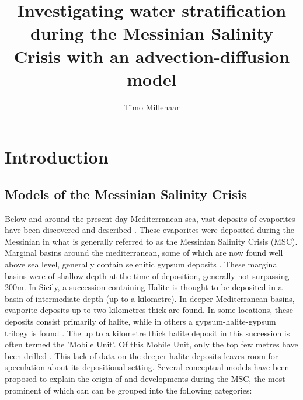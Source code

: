 \documentclass[twocolumn]{article}
\title{Investigating water stratification during the Messinian Salinity Crisis with an advection-diffusion model}
\author{Timo Millenaar}
\begin{document}

\section{Introduction}
\subsection{Models of the Messinian Salinity Crisis}
Below and around the present day Mediterranean sea, vast deposits of evaporites have been discovered and described \citep{hsu1972origin, krijgsman1999chronology, rouchy2006messinian, roveri2014messinian, garcia2018geochemical}. These evaporites were deposited during the Messinian in what is generally referred to as the Messinian Salinity Crisis (MSC). Marginal basins around the mediterranean, some of which are now found well above sea level, generally contain selenitic gypsum deposits \citep{garcia2018geochemical}. These marginal basins were of shallow depth at the time of deposition, generally not surpassing 200m. In Sicily, a succession containing Halite is thought to be deposited in a basin of intermediate depth (up to a kilometre). In deeper Mediterranean basins, evaporite deposits up to two kilometres thick are found. In some locations, these deposits consist primarily of halite, while in others a gypsum-halite-gypsum trilogy is found \citep{roveri2014messinian}. The up to a kilometre thick halite deposit in this succession is often termed the 'Mobile Unit'. Of this Mobile Unit, only the top few metres have been drilled \citep{hsu1972origin}. This lack of data on the deeper halite deposits leaves room for speculation about its depositional setting. Several conceptual models have been proposed to explain the origin of and developments during the MSC, the most prominent of which can can be grouped into the following categories:\\
\end{document}
